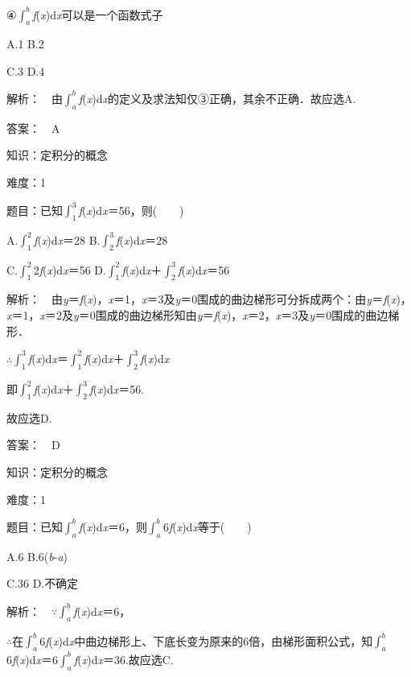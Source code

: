 \documentclass{article} %
\begin{document}
④$\int_a^b$\textit{f}(\textit{x})d\textit{x}可以是一个函数式子

A.1        B.2

C.3        D.4

 解析：　由$\int_a^b$\textit{f}(\textit{x})d\textit{x}的定义及求法知仅③正确，其余不正确．故应选A.

 答案：　A



 知识：定积分的概念

 难度：1

 题目：已知$\int_1^3$\textit{f}(\textit{x})d\textit{x}＝56，则(　　)

A.$\int_1^2$\textit{f}(\textit{x})d\textit{x}＝28      B.$\int_2^3$\textit{f}(\textit{x})d\textit{x}＝28

C.$\int_1^2$2\textit{f}(\textit{x})d\textit{x}＝56      D.$\int_1^2$\textit{f}(\textit{x})d\textit{x}＋$\int_2^3$\textit{f}(\textit{x})d\textit{x}＝56

 解析：　由\textit{y}＝\textit{f}(\textit{x})，\textit{x}＝1，\textit{x}＝3及\textit{y}＝0围成的曲边梯形可分拆成两个：由\textit{y}＝\textit{f}(\textit{x})，\textit{x}＝1，\textit{x}＝2及\textit{y}＝0围成的曲边梯形知由\textit{y}＝\textit{f}(\textit{x})，\textit{x}＝2，\textit{x}＝3及\textit{y}＝0围成的曲边梯形．

$\mathrm{\therefore}\int_1^3$\textit{f}(\textit{x})d\textit{x}＝$\int_1^2$\textit{f}(\textit{x})d\textit{x}＋$\int_2^3$\textit{f}(\textit{x})d\textit{x}

即$\int_1^2$\textit{f}(\textit{x})d\textit{x}＋$\int_2^3$\textit{f}(\textit{x})d\textit{x}＝56.

故应选D.

 答案：　D



 知识：定积分的概念

 难度：1

 题目：已知$\int_a^b$\textit{f}(\textit{x})d\textit{x}＝6，则$\int_a^b$6\textit{f}(\textit{x})d\textit{x}等于(　　)

A.6        B.6(\textit{b}-\textit{a})

C.36        D.不确定

 解析：　$\mathrm{\because}$$\int_a^b$\textit{f}(\textit{x})d\textit{x}＝6，

$\mathrm{\therefore}$在$\int_a^b$6\textit{f}(\textit{x})d\textit{x}中曲边梯形上、下底长变为原来的6倍，由梯形面积公式，知$\int_a^b$6\textit{f}(\textit{x})d\textit{x}＝6$\int_a^b$\textit{f}(\textit{x})d\textit{x}＝36.故应选C.
\end{document}
